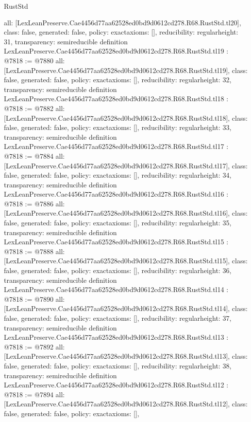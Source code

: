 \begin{lexlean}{RustStd}
\begin{coremodule}
{  all: [LexLeanPreserve.Cae4456d77aa62528ed0bd9d0612cd278.R68.RustStd.tl20],
  class: false,
  generated: false,
  policy: exact{axioms: []},
  reducibility: regular{height: 31},
  transparency: semireducible
}
definition LexLeanPreserve.Cae4456d77aa62528ed0bd9d0612cd278.R68.RustStd.tl19 : @7818 := @7880 {
  all: [LexLeanPreserve.Cae4456d77aa62528ed0bd9d0612cd278.R68.RustStd.tl19],
  class: false,
  generated: false,
  policy: exact{axioms: []},
  reducibility: regular{height: 32},
  transparency: semireducible
}
definition LexLeanPreserve.Cae4456d77aa62528ed0bd9d0612cd278.R68.RustStd.tl18 : @7818 := @7882 {
  all: [LexLeanPreserve.Cae4456d77aa62528ed0bd9d0612cd278.R68.RustStd.tl18],
  class: false,
  generated: false,
  policy: exact{axioms: []},
  reducibility: regular{height: 33},
  transparency: semireducible
}
definition LexLeanPreserve.Cae4456d77aa62528ed0bd9d0612cd278.R68.RustStd.tl17 : @7818 := @7884 {
  all: [LexLeanPreserve.Cae4456d77aa62528ed0bd9d0612cd278.R68.RustStd.tl17],
  class: false,
  generated: false,
  policy: exact{axioms: []},
  reducibility: regular{height: 34},
  transparency: semireducible
}
definition LexLeanPreserve.Cae4456d77aa62528ed0bd9d0612cd278.R68.RustStd.tl16 : @7818 := @7886 {
  all: [LexLeanPreserve.Cae4456d77aa62528ed0bd9d0612cd278.R68.RustStd.tl16],
  class: false,
  generated: false,
  policy: exact{axioms: []},
  reducibility: regular{height: 35},
  transparency: semireducible
}
definition LexLeanPreserve.Cae4456d77aa62528ed0bd9d0612cd278.R68.RustStd.tl15 : @7818 := @7888 {
  all: [LexLeanPreserve.Cae4456d77aa62528ed0bd9d0612cd278.R68.RustStd.tl15],
  class: false,
  generated: false,
  policy: exact{axioms: []},
  reducibility: regular{height: 36},
  transparency: semireducible
}
definition LexLeanPreserve.Cae4456d77aa62528ed0bd9d0612cd278.R68.RustStd.tl14 : @7818 := @7890 {
  all: [LexLeanPreserve.Cae4456d77aa62528ed0bd9d0612cd278.R68.RustStd.tl14],
  class: false,
  generated: false,
  policy: exact{axioms: []},
  reducibility: regular{height: 37},
  transparency: semireducible
}
definition LexLeanPreserve.Cae4456d77aa62528ed0bd9d0612cd278.R68.RustStd.tl13 : @7818 := @7892 {
  all: [LexLeanPreserve.Cae4456d77aa62528ed0bd9d0612cd278.R68.RustStd.tl13],
  class: false,
  generated: false,
  policy: exact{axioms: []},
  reducibility: regular{height: 38},
  transparency: semireducible
}
definition LexLeanPreserve.Cae4456d77aa62528ed0bd9d0612cd278.R68.RustStd.tl12 : @7818 := @7894 {
  all: [LexLeanPreserve.Cae4456d77aa62528ed0bd9d0612cd278.R68.RustStd.tl12],
  class: false,
  generated: false,
  policy: exact{axioms: []},
}
\end{coremodule}
\end{lexlean}
